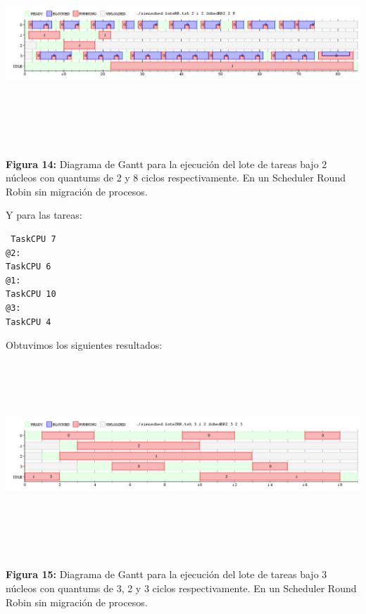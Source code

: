 \documentclass[a4paper]{article}
\begin{document}
\includegraphics[width=\textwidth,height=3.0in,keepaspectratio
]{imagenes/ej8/2eje3.png} \\
\begin {flushleft}
\textbf{Figura 14:} Diagrama de Gantt para la ejecuci\'on del lote de tareas bajo 2 n\'ucleos con quantums de 2 y 8 ciclos respectivamente. En un Scheduler Round Robin sin migración de procesos.
\end{flushleft}	

\bigskip
Y para las tareas: 
  
 \begin{codesnippet}
	\begin{verbatim}
 TaskCPU 7
@2:
TaskCPU 6
@1:
TaskCPU 10
@3:
TaskCPU 4
	\end{verbatim}
	\end{codesnippet}
	
Obtuvimos los siguientes resultados:\\
	
\includegraphics[width=\textwidth,height=3.0in,keepaspectratio
]{imagenes/ej8/2eje4.png} \\
\begin {flushleft}
\textbf{Figura 15:} Diagrama de Gantt para la ejecuci\'on del lote de tareas bajo 3 n\'ucleos con quantums de 3, 2 y 3 ciclos respectivamente. En un Scheduler Round Robin sin migración de procesos.
\end{flushleft}	
	
\end{document}
